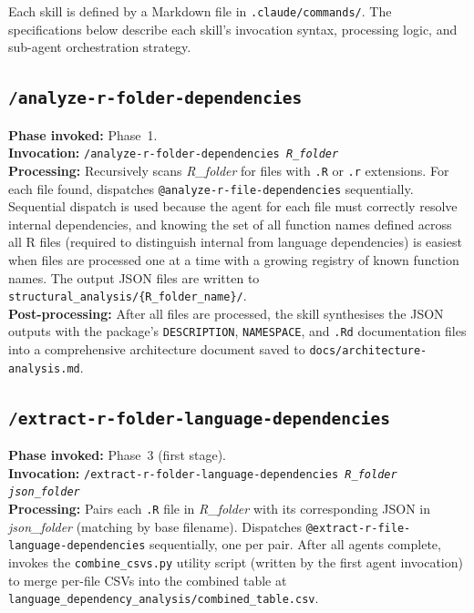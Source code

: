 \documentclass[12pt,a4paper]{article}
\makeatletter
\newcommand{\agent}[1]{\texttt{@#1}}
\makeatother
\begin{document}
Each skill is defined by a Markdown file in \texttt{.claude/commands/}. The specifications below describe each skill's invocation syntax, processing logic, and sub-agent orchestration strategy.

\subsection{\texttt{/analyze-r-folder-dependencies}}
\label{supp:skill-analyze-r}

\textbf{Phase invoked:} Phase~1.\\
\textbf{Invocation:} \texttt{/analyze-r-folder-dependencies \textit{R\_folder}}\\
\textbf{Processing:} Recursively scans \textit{R\_folder} for files with \texttt{.R} or \texttt{.r} extensions. For each file found, dispatches \agent{analyze-r-file-dependencies} sequentially. Sequential dispatch is used because the agent for each file must correctly resolve internal dependencies, and knowing the set of all function names defined across all R files (required to distinguish internal from language dependencies) is easiest when files are processed one at a time with a growing registry of known function names. The output JSON files are written to \texttt{structural\_analysis/\{R\_folder\_name\}/}.\\
\textbf{Post-processing:} After all files are processed, the skill synthesises the JSON outputs with the package's \texttt{DESCRIPTION}, \texttt{NAMESPACE}, and \texttt{.Rd} documentation files into a comprehensive architecture document saved to \texttt{docs/architecture-analysis.md}.

\subsection{\texttt{/extract-r-folder-language-dependencies}}
\label{supp:skill-extract-lang}

\textbf{Phase invoked:} Phase~3 (first stage).\\
\textbf{Invocation:} \texttt{/extract-r-folder-language-dependencies \textit{R\_folder} \textit{json\_folder}}\\
\textbf{Processing:} Pairs each \texttt{.R} file in \textit{R\_folder} with its corresponding JSON in \textit{json\_folder} (matching by base filename). Dispatches \agent{extract-r-file-language-dependencies} sequentially, one per pair. After all agents complete, invokes the \texttt{combine\_csvs.py} utility script (written by the first agent invocation) to merge per-file CSVs into the combined table at \texttt{language\_dependency\_analysis/combined\_table.csv}.
\end{document}
